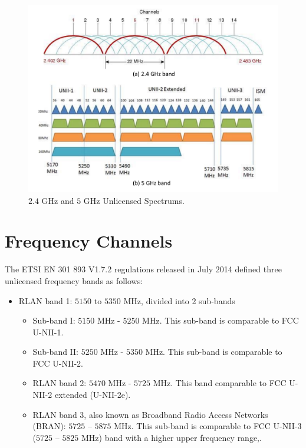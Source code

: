 \begin{figure}[!t]
	\centering
	\includegraphics[width=1.0\columnwidth]{figures2/2-5GHz-spectrum.pdf}
	\caption{$2.4$ GHz and $5$ GHz Unlicensed Spectrums.}
	\label{figs:2-5GHz-spectrum}
\end{figure}


\section{Frequency Channels}

The ETSI EN 301 893 V1.7.2 regulations \cite{LBT-ETSI-2014} released in July 2014 defined three unlicensed frequency bands as follows:
\begin{itemize}
\item
RLAN band 1: $5150$ to $5350$ MHz, divided into 2 sub-bands
\begin{itemize}
\item
Sub-band I: $5150$ MHz - $5250$ MHz. This sub-band is comparable to FCC U-NII-1. 
\item
Sub-band II: $5250$ MHz - $5350$ MHz. This sub-band is comparable to FCC U-NII-2.
\item
RLAN band 2: $5470$ MHz - $5725$ MHz. This band comparable to FCC U-NII-2 extended (U-NII-2e).
\item
RLAN band 3, also known as Broadband Radio Access Networks (BRAN): $5725$ – $5875$ MHz. This sub-band is comparable to FCC U-NII-3 ($5725$ – $5825$ MHz) band with a higher upper frequency range,.
\end{itemize}
\end{itemize}

